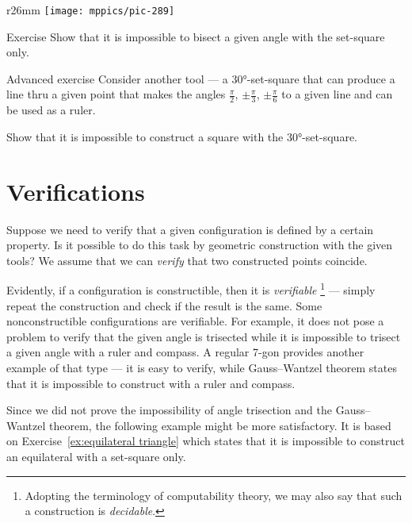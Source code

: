 {

\begin{wrapfigure}{r}{26mm}
\vskip-8mm
\centering
\texttt{[image: mppics/pic-289]}
\end{wrapfigure}


\begin{thm}{Exercise}\label{ex:set-square-bisect}
Show that it is impossible to bisect a given angle with the set-square only.
\end{thm}

\begin{thm}{Advanced exercise}\label{ex:90-60-30}
Consider another tool --- a 30°-set-square that can produce a line thru a given point
that makes the angles
$\tfrac\pi2$, $\pm\tfrac\pi3$, $\pm\tfrac\pi6$
to a given line and can be used as a ruler.

{Show that it is impossible to construct a square with the 30°-set-square.}
\end{thm}

}

\section{Verifications}
\label{sec:verification}

Suppose we need to verify that a given configuration is defined by a certain property. 
Is it possible to do this task by geometric construction with the given tools?
We assume that we can \textit{verify} that two constructed points coincide.

Evidently, if a configuration is constructible, then it is \emph{verifiable}%
\footnote{Adopting the terminology of computability theory, we may also say that such a construction is \emph{decidable}.} --- simply repeat the construction and check if the result is the same.
Some nonconstructible configurations are verifiable.
For example, it does not pose a problem to verify that the given angle is trisected while it is impossible to trisect a given angle with a ruler and compass.
A regular 7-gon provides another example of that type --- it is easy to verify, while Gauss--Wantzel theorem states that it is impossible to construct with a ruler and compass.

Since we did not prove the impossibility of angle trisection and the Gauss--Wantzel theorem, the following example might be more satisfactory.
It is based on Exercise~\ref{ex:equilateral triangle} which states that it is impossible to construct an equilateral with a set-square only.

